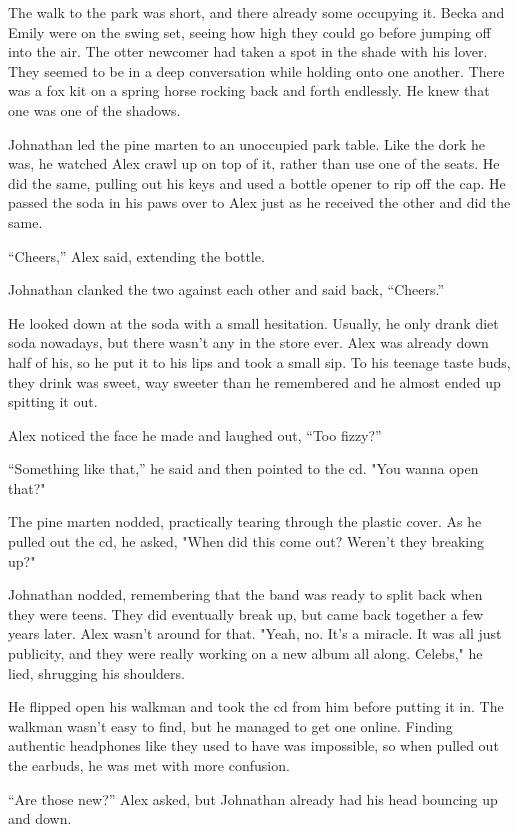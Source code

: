 The walk to the park was short, and there already some occupying it.
Becka and Emily were on the swing set, seeing how high they could go
before jumping off into the air. The otter newcomer had taken a spot in
the shade with his lover. They seemed to be in a deep conversation while
holding onto one another. There was a fox kit on a spring horse rocking
back and forth endlessly. He knew that one was one of the shadows.

Johnathan led the pine marten to an unoccupied park table. Like the dork
he was, he watched Alex crawl up on top of it, rather than use one of
the seats. He did the same, pulling out his keys and used a bottle
opener to rip off the cap. He passed the soda in his paws over to Alex
just as he received the other and did the same.

``Cheers,'' Alex said, extending the bottle.

Johnathan clanked the two against each other and said back, ``Cheers.''

He looked down at the soda with a small hesitation. Usually, he only
drank diet soda nowadays, but there wasn't any in the store ever. Alex
was already down half of his, so he put it to his lips and took a small
sip. To his teenage taste buds, they drink was sweet, way sweeter than
he remembered and he almost ended up spitting it out.

Alex noticed the face he made and laughed out, ``Too fizzy?''

``Something like that,'' he said and then pointed to the cd. "You wanna
open that?"

The pine marten nodded, practically tearing through the plastic cover.
As he pulled out the cd, he asked, "When did this come out? Weren't they
breaking up?"

Johnathan nodded, remembering that the band was ready to split back when
they were teens. They did eventually break up, but came back together a
few years later. Alex wasn't around for that. "Yeah, no. It's a miracle.
It was all just publicity, and they were really working on a new album
all along. Celebs," he lied, shrugging his shoulders.

He flipped open his walkman and took the cd from him before putting it
in. The walkman wasn't easy to find, but he managed to get one online.
Finding authentic headphones like they used to have was impossible, so
when pulled out the earbuds, he was met with more confusion.

``Are those new?'' Alex asked, but Johnathan already had his head bouncing
up and down.

